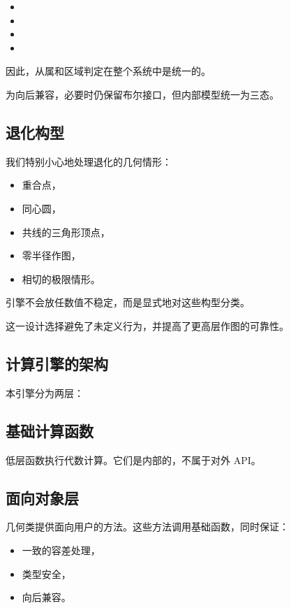 \begin{itemize}
\item {}
\item {}
\item {}
\item {}
\end{itemize}

因此，从属和区域判定在整个系统中是统一的。

为向后兼容，必要时仍保留布尔接口，但内部模型统一为三态。

\subsection{退化构型}


我们特别小心地处理退化的几何情形：

\begin{itemize}
\item 重合点，
\item 同心圆，
\item 共线的三角形顶点，
\item 零半径作图，
\item 相切的极限情形。
\end{itemize}

引擎不会放任数值不稳定，而是显式地对这些构型分类。

这一设计选择避免了未定义行为，并提高了更高层作图的可靠性。

\subsection{计算引擎的架构}

本引擎分为两层：

\subsection*{基础计算函数}

低层函数执行代数计算。它们是内部的，不属于对外 API。

\subsection*{面向对象层}

几何类提供面向用户的方法。这些方法调用基础函数，同时保证：

\begin{itemize}
\item 一致的容差处理，
\item 类型安全，
\item 向后兼容。
\end{itemize}

